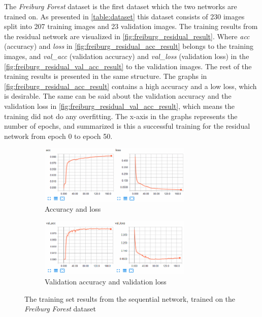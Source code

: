 \documentclass[USenglish]{ifimaster}  %
\begin{document}
The \textit{Freiburg Forest} dataset is the first dataset which the two networks are trained on. As presented in \cref{table:dataset} this dataset consists of 230 images split into 207 training images and 23 validation images. The training results from the residual network are visualized in \cref{fig:freiburg_residual_result}. Where \textit{acc} (accuracy) and \textit{loss} in \cref{fig:freiburg_residual_acc_result} belongs to the training images, and \textit{val\_acc} (validation accuracy) and \textit{val\_loss} (validation loss) in the \cref{fig:freiburg_residual_val_acc_result} to the validation images. The rest of the training results is presented in the same structure. The graphs in \cref{fig:freiburg_residual_acc_result} contains a high accuracy and a low loss, which is desirable. The same can be said about the validation accuracy and the validation loss in \cref{fig:freiburg_residual_val_acc_result}, which means the training did not do any overfitting. The x-axis in the graphs represents the number of epochs, and summarized is this a successful training for the residual network from epoch 0 to epoch 50.

\begin{figure}[ht]
\centering
\begin{subfigure}[b]{\textwidth}
\centering
\includegraphics[width=0.8\textwidth]{bilder/freiburg_training/freiburg_sequential_training_acc_results.png}
\caption{Accuracy and loss}
\label{fig:freiburg_sequential_acc_result}
\end{subfigure}
\hfill
\begin{subfigure}[b]{\textwidth}
\centering
\includegraphics[width=0.8\textwidth]{bilder/freiburg_training/freiburg_sequential_training_val_acc_results.png}
\caption{Validation accuracy and validation loss}
\label{fig:freiburg_sequential_val_acc_result}
\end{subfigure}
\caption{The training set results from the sequential network, trained on the \textit{Freiburg Forest} dataset}
\label{fig:freiburg_sequential_result}
\end{figure}
\end{document}
